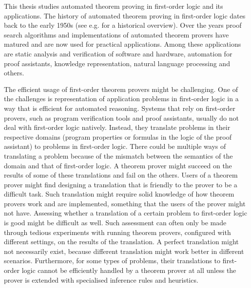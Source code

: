 
This thesis studies automated theorem proving in first-order logic and its applications. The history of automated theorem proving in first-order logic dates back to the early 1950s (see e.g. \cite{bundy1999survey,davis2001early,harrison2007short} for a historical overview). Over the years proof search algorithms and implementations of automated theorem provers have matured and are now used for practical applications. Among these applications are static analysis and verification of software and hardware, automation for proof assistants, knowledge representation, natural language processing and others.

The efficient usage of first-order theorem provers might be challenging. One of the challenges is representation of application problems in first-order logic in a way that is efficient for automated reasoning. Systems that rely on first-order provers, such as program verification tools and proof assistants, usually do not deal with first-order logic natively. Instead, they translate problems in their respective domains (program properties or formulas in the logic of the proof assistant) to problems in first-order logic. There could be multiple ways of translating a problem because of the mismatch between the semantics of the domain and that of first-order logic. A theorem prover might succeed on the results of some of these translations and fail on the others. Users of a theorem prover might find designing a translation that is friendly to the prover to be a difficult task. Such translation might require solid knowledge of how theorem provers work and are implemented, something that the users of the prover might not have. Assessing whether a translation of a certain problem to first-order logic is good might be difficult as well. Such assessment can often only be made through tedious experiments with running theorem provers, configured with different settings, on the results of the translation. A perfect translation might not necessarily exist, because different translation might work better in different scenarios. Furthermore, for some types of problems, their translations to first-order logic cannot be efficiently handled by a theorem prover at all unless the prover is extended with specialised inference rules and heuristics.

